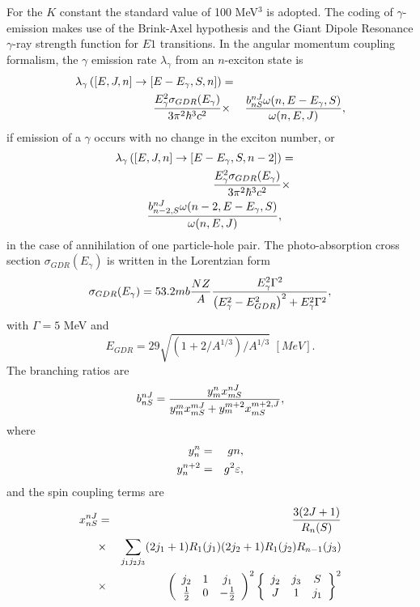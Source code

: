 For the $K$ constant the standard value of 100 MeV$^{3}$ is adopted. The
coding of $\gamma$-emission makes use of the Brink-Axel hypothesis \cite%
{Axel,Brink,Brinka} and the Giant Dipole Resonance $\gamma$-ray strength
function for $E1$ transitions. In the angular momentum coupling
formalism, the $\gamma$ emission rate $\lambda_{\gamma}$ from an $n$-exciton
state is
\begin{eqnarray}
\lambda_{\gamma}\left(\left[E,J,n\right]\rightarrow\left[E-E_{\gamma},S,n%
\right]\right)&=& \\
\frac{E_{\gamma}^{2}\sigma_{GDR}(E_{\gamma})}{3\pi^{2}\hbar^{3}c^{2}}&\times&%
\frac{b_{nS}^{nJ}\omega(n,E-E_{\gamma},S)}{\omega(n,E,J)} ,  \notag
\end{eqnarray}
if emission of a $\gamma$ occurs with no change in the exciton number, or
\begin{eqnarray}
\lambda_{\gamma}\left(\left[E,J,n\right]\rightarrow\left[E-E_{\gamma},S,n-2%
\right]\right)&=&  \notag \\
\frac{E_{\gamma}^{2}\sigma_{GDR}(E_{\gamma})}{3\pi^{2}\hbar^{3}c^{2}}&\times&
\notag \\
\frac{b_{n-2,S}^{nJ}\omega(n-2,E-E_{\gamma},S)}{\omega(n,E,J)},&&
\end{eqnarray}
in the case of annihilation of one particle-hole pair. The photo-absorption
cross section $\sigma_{GDR}(E_{\gamma})$ is written in the Lorentzian form
\begin{equation}
\sigma_{GDR}(E_{\gamma})=53.2mb\frac{NZ}{A}\frac{E_{\gamma}^{2}\Gamma^{2}}{%
\left(E_{\gamma}^{2}-E_{GDR}^{2}\right)^{2}+E_{\gamma}^{2}\Gamma^{2}},
\end{equation}
with $\Gamma=5$ MeV and
\begin{equation}
E_{GDR}=29\sqrt{\left(1+2/A^{1/3}\right)/A^{1/3}}\,\,[MeV].
\end{equation}
The branching ratios are
\begin{equation}
b_{nS}^{nJ}=\frac{y_{m}^{n}x_{mS}^{nJ}}{%
y_{m}^{m}x_{mS}^{mJ}+y_{m}^{m+2}x_{mS}^{m+2,J}},
\end{equation}
\noindent where
\begin{eqnarray}
y_{n}^{n} & = & gn,  \notag \\
y_{n}^{n+2} & = & g^{2}\varepsilon,
\end{eqnarray}
and the spin coupling terms are
\begin{eqnarray}
x_{nS}^{nJ} & = & \frac{3(2J+1)}{R_{n}(S)}  \notag \\
& \times
&\sum_{j_{1}j_{2}j_{3}}(2j_{1}+1)R_{1}(j_{1})(2j_{2}+1)R_{1}(j_{2})R_{n-1}(j_{3})
\notag \\
& \times & \left(%
\begin{array}{ccc}
j_{2} & 1 & j_{1} \\
\frac{1}{2} & 0 & -\frac{1}{2}%
\end{array}%
\right)^{2}\left\{
\begin{array}{ccc}
j_{2} & j_{3} & S \\
J & 1 & j_{1}%
\end{array}%
\right\} ^{2}
\end{eqnarray}
